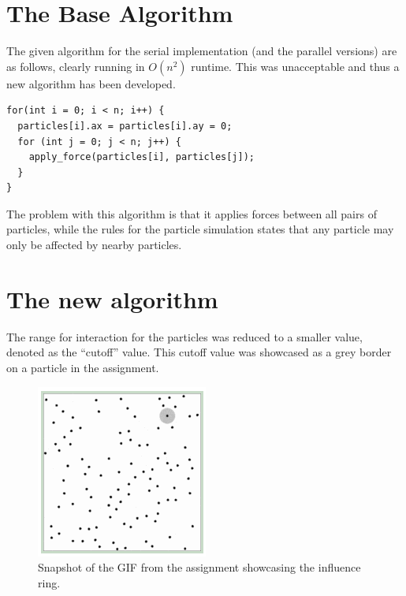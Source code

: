 \documentclass[a4paper,11pt,oneside]{book}
\begin{document}

\section{The Base Algorithm}

The given algorithm for the serial implementation (and the parallel versions) are as follows, clearly running in
$O(n^{2})$ runtime. This was unacceptable and thus a new algorithm has been developed.

\begin{verbatim}
for(int i = 0; i < n; i++) {
  particles[i].ax = particles[i].ay = 0;
  for (int j = 0; j < n; j++) {
    apply_force(particles[i], particles[j]);
  }
}
\end{verbatim}

The problem with this algorithm is that it applies forces between all pairs of particles, while the rules for the
particle simulation states that any particle may only be affected by nearby particles.

\section{The new algorithm}

The range for interaction for the particles was reduced to a smaller value, denoted as the ``cutoff'' value. This cutoff
value was showcased as a grey border on a particle in the assignment.

\begin{figure}[H]
  \centering
  \begin{minipage}[b]{0.4\textwidth}
    \includegraphics[width=\textwidth]{cutoff.png}
    \caption{Snapshot of the GIF from the assignment showcasing the influence ring.}
  \end{minipage}
\end{figure}
\end{document}
